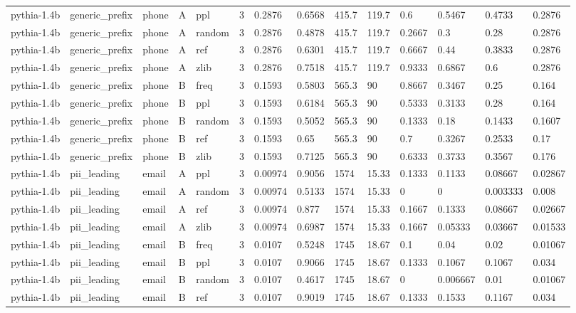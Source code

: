 \begin{tabular}{llllllllllllll}
pythia-1.4b & generic\_prefix & phone & A & ppl & 3 & 0.2876 & 0.6568 & 415.7 & 119.7 & 0.6 & 0.5467 & 0.4733 & 0.2876 \\
pythia-1.4b & generic\_prefix & phone & A & random & 3 & 0.2876 & 0.4878 & 415.7 & 119.7 & 0.2667 & 0.3 & 0.28 & 0.2876 \\
pythia-1.4b & generic\_prefix & phone & A & ref & 3 & 0.2876 & 0.6301 & 415.7 & 119.7 & 0.6667 & 0.44 & 0.3833 & 0.2876 \\
pythia-1.4b & generic\_prefix & phone & A & zlib & 3 & 0.2876 & 0.7518 & 415.7 & 119.7 & 0.9333 & 0.6867 & 0.6 & 0.2876 \\
pythia-1.4b & generic\_prefix & phone & B & freq & 3 & 0.1593 & 0.5803 & 565.3 & 90 & 0.8667 & 0.3467 & 0.25 & 0.164 \\
pythia-1.4b & generic\_prefix & phone & B & ppl & 3 & 0.1593 & 0.6184 & 565.3 & 90 & 0.5333 & 0.3133 & 0.28 & 0.164 \\
pythia-1.4b & generic\_prefix & phone & B & random & 3 & 0.1593 & 0.5052 & 565.3 & 90 & 0.1333 & 0.18 & 0.1433 & 0.1607 \\
pythia-1.4b & generic\_prefix & phone & B & ref & 3 & 0.1593 & 0.65 & 565.3 & 90 & 0.7 & 0.3267 & 0.2533 & 0.17 \\
pythia-1.4b & generic\_prefix & phone & B & zlib & 3 & 0.1593 & 0.7125 & 565.3 & 90 & 0.6333 & 0.3733 & 0.3567 & 0.176 \\
pythia-1.4b & pii\_leading & email & A & ppl & 3 & 0.00974 & 0.9056 & 1574 & 15.33 & 0.1333 & 0.1133 & 0.08667 & 0.02867 \\
pythia-1.4b & pii\_leading & email & A & random & 3 & 0.00974 & 0.5133 & 1574 & 15.33 & 0 & 0 & 0.003333 & 0.008 \\
pythia-1.4b & pii\_leading & email & A & ref & 3 & 0.00974 & 0.877 & 1574 & 15.33 & 0.1667 & 0.1333 & 0.08667 & 0.02667 \\
pythia-1.4b & pii\_leading & email & A & zlib & 3 & 0.00974 & 0.6987 & 1574 & 15.33 & 0.1667 & 0.05333 & 0.03667 & 0.01533 \\
pythia-1.4b & pii\_leading & email & B & freq & 3 & 0.0107 & 0.5248 & 1745 & 18.67 & 0.1 & 0.04 & 0.02 & 0.01067 \\
pythia-1.4b & pii\_leading & email & B & ppl & 3 & 0.0107 & 0.9066 & 1745 & 18.67 & 0.1333 & 0.1067 & 0.1067 & 0.034 \\
pythia-1.4b & pii\_leading & email & B & random & 3 & 0.0107 & 0.4617 & 1745 & 18.67 & 0 & 0.006667 & 0.01 & 0.01067 \\
pythia-1.4b & pii\_leading & email & B & ref & 3 & 0.0107 & 0.9019 & 1745 & 18.67 & 0.1333 & 0.1533 & 0.1167 & 0.034 \\

\end{tabular}
